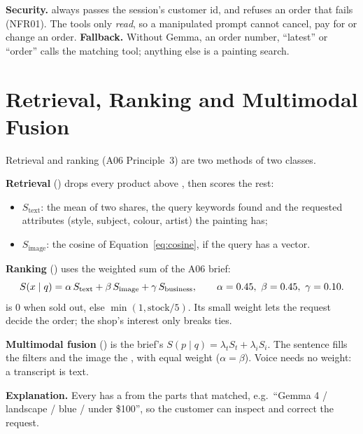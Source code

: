 \textbf{Security.}  always passes the session's customer id, and  refuses an order
that fails  (NFR01). The tools only \emph{read}, so a manipulated prompt cannot cancel, pay for
or change an order. \textbf{Fallback.} Without Gemma, an order number, ``latest'' or ``order'' calls the matching
tool; anything else is a painting search.

\section{Retrieval, Ranking and Multimodal Fusion}\label{sec:3.10}

Retrieval and ranking (A06 Principle~3) are two methods of two classes.

\textbf{Retrieval} () drops every product above , then scores
the rest:
\begin{itemize}
\item $S_{\text{text}}$: the mean of two shares, the query keywords found and the requested attributes (style,
      subject, colour, artist) the painting has;
\item $S_{\text{image}}$: the cosine of Equation~\ref{eq:cosine}, if the query has a vector.
\end{itemize}
\textbf{Ranking} () uses the weighted sum of the A06 brief:
\begin{equation}
S(x \mid q) = \alpha\, S_{\text{text}} + \beta\, S_{\text{image}} + \gamma\, S_{\text{business}},
\qquad \alpha = 0.45,\ \beta = 0.45,\ \gamma = 0.10.
\label{eq:ranking}
\end{equation}
 is 0 when sold out, else $\min(1, \text{stock}/5)$. Its small weight lets the
request decide the order; the shop's interest only breaks ties.

\textbf{Multimodal fusion} () is the brief's
$S(p \mid q) = \lambda_t S_t + \lambda_i S_i$. The sentence fills the filters and the image the ,
with equal weight ($\alpha = \beta$). Voice needs no weight: a transcript is text.

\textbf{Explanation.} Every  has a  from the parts that matched, e.g.\ ``Gemma 4 / landscape / blue / under
\$100'', so the customer can inspect and correct the request.

